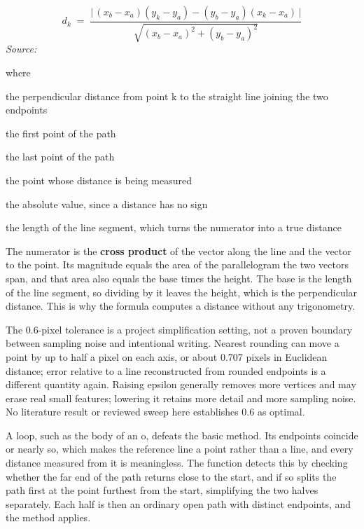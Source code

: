 \begin{equation}
d_k \;=\; \frac{\big|\,(x_b-x_a)(y_k-y_a) - (y_b-y_a)(x_k-x_a)\,\big|}{\sqrt{(x_b-x_a)^2 + (y_b-y_a)^2}}
\end{equation}
\noindent\emph{Source: }\cite{douglaspeucker1973}


\noindent where
\begin{description}[leftmargin=2.4em,style=nextline,font=\normalfont\ttfamily]\setlength\itemsep{1pt}
  \item[{$d_k$}] \normalfont the perpendicular distance from point k to the straight line joining the two endpoints
  \item[{$(x_a,y_a)$}] \normalfont the first point of the path
  \item[{$(x_b,y_b)$}] \normalfont the last point of the path
  \item[{$(x_k,y_k)$}] \normalfont the point whose distance is being measured
  \item[{$|\cdot|$}] \normalfont the absolute value, since a distance has no sign
  \item[{$\sqrt{\cdot}$}] \normalfont the length of the line segment, which turns the numerator into a true distance
\end{description}
The numerator is the \textbf{cross product} of the vector along the line and the vector to the point. Its magnitude equals the area of the parallelogram the two vectors span, and that area also equals the base times the height. The base is the length of the line segment, so dividing by it leaves the height, which is the perpendicular distance. This is why the formula computes a distance without any trigonometry.


The 0.6-pixel tolerance is a project simplification setting, not a proven boundary between sampling noise and intentional writing. Nearest rounding can move a point by up to half a pixel on each axis, or about 0.707 pixels in Euclidean distance; error relative to a line reconstructed from rounded endpoints is a different quantity again. Raising epsilon generally removes more vertices and may erase real small features; lowering it retains more detail and more sampling noise. No literature result or reviewed sweep here establishes 0.6 as optimal.


A loop, such as the body of an o, defeats the basic method. Its endpoints coincide or nearly so, which makes the reference line a point rather than a line, and every distance measured from it is meaningless. The function detects this by checking whether the far end of the path returns close to the start, and if so splits the path first at the point furthest from the start, simplifying the two halves separately. Each half is then an ordinary open path with distinct endpoints, and the method applies.


